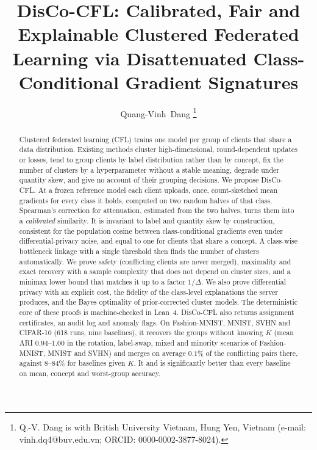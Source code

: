 \documentclass[journal]{IEEEtran}
\theoremstyle{definition}
\newif\ifanon
\begin{document}
\title{DisCo-CFL: Calibrated, Fair and Explainable Clustered Federated Learning via Disattenuated Class-Conditional Gradient Signatures}
\ifanon
\author{Anonymous Authors}
\markboth{IEEE Transactions on Neural Networks and Learning Systems}{Anonymous: DisCo-CFL}
\else
\author{Quang-Vinh~Dang%
\thanks{Q.-V. Dang is with British University Vietnam, Hung Yen, Vietnam (e-mail: vinh.dq4@buv.edu.vn; ORCID: 0000-0002-3877-8024).}}

\fi
\maketitle

\begin{abstract}
Clustered federated learning (CFL) trains one model per group of clients that share a data distribution. Existing methods cluster high-dimensional, round-dependent updates or losses, tend to group clients by label distribution rather than by concept, fix the number of clusters by a hyperparameter without a stable meaning, degrade under quantity skew, and give no account of their grouping decisions. We propose DisCo-CFL. At a frozen reference model each client uploads, once, count-sketched mean gradients for every class it holds, computed on two random halves of that class. Spearman's correction for attenuation, estimated from the two halves, turns them into a \emph{calibrated} similarity. It is invariant to label and quantity skew by construction, consistent for the population cosine between class-conditional gradients even under differential-privacy noise, and equal to one for clients that share a concept. A class-wise bottleneck linkage with a single threshold then finds the number of clusters automatically. We prove safety (conflicting clients are never merged), maximality and exact recovery with a sample complexity that does not depend on cluster sizes, and a minimax lower bound that matches it up to a factor $1/\Delta$. We also prove differential privacy with an explicit cost, the fidelity of the class-level explanations the server produces, and the Bayes optimality of prior-corrected cluster models. The deterministic core of these proofs is machine-checked in Lean~4. DisCo-CFL also returns assignment certificates, an audit log and anomaly flags. On Fashion-MNIST, MNIST, SVHN and CIFAR-10 (618 runs, nine baselines), it recovers the groups without knowing $K$ (mean ARI $0.94$--$1.00$ in the rotation, label-swap, mixed and minority scenarios of Fashion-MNIST, MNIST and SVHN) and merges on average $0.1\%$ of the conflicting pairs there, against 8--84\% for baselines given $K$. It and is significantly better than every baseline on mean, concept and worst-group accuracy.
\end{abstract}
\end{document}
